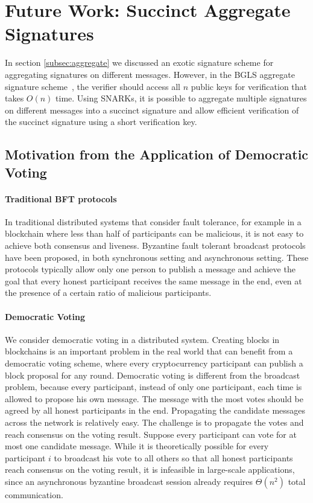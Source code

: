\section{Future Work: Succinct Aggregate Signatures}

In section \ref{subsec:aggregate} we discussed an exotic signature scheme for aggregating signatures on different messages. However, in the BGLS aggregate signature scheme~\cite{DBLP:conf/eurocrypt/BonehGLS03}, the verifier should access all $n$ public keys for verification that takes $O(n)$ time. Using SNARKs, it is possible to aggregate multiple signatures on different messages into a succinct signature and allow efficient verification of the succinct signature using a short verification key. 

\subsection{Motivation from the Application of Democratic Voting} 

\paragraph{Traditional BFT protocols} In traditional distributed systems that consider fault tolerance, for example in a blockchain where less than half of participants can be malicious, it is not easy to achieve both consensus and liveness. Byzantine fault tolerant broadcast protocols have been proposed, in both synchronous setting and asynchronous setting. These protocols typically allow only one person to publish a message and achieve the goal that every honest participant receives the same message in the end, even at the presence of a certain ratio of malicious participants. 

\paragraph{Democratic Voting} We consider democratic voting in a distributed system. Creating blocks in blockchains is an important problem in the real world that can benefit from a democratic voting scheme,  where every cryptocurrency participant can publish a block proposal for any round. Democratic voting is different from the broadcast problem, because every participant, instead of only one participant, each time is allowed to propose his own message. The message with the most votes should be agreed by all honest participants in the end. Propagating the candidate messages across the network is relatively easy. The challenge is to propagate the votes and reach consensus on the voting result. Suppose every participant can vote for at most one candidate message. While it is theoretically possible for every participant $i$ to broadcast his vote to all others so that all honest participants reach consensus on the voting result, it is infeasible in large-scale applications, since an asynchronous byzantine broadcast session already requires $\Theta(n^2)$ total communication. 


